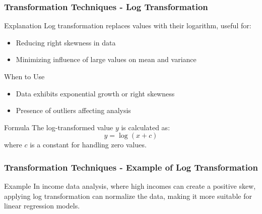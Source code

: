 \documentclass[aspectratio=169]{beamer}
\begin{document}
\begin{frame}[fragile]
    \frametitle{Transformation Techniques - Log Transformation}
    \begin{block}{Explanation}
        Log transformation replaces values with their logarithm, useful for:
        \begin{itemize}
            \item Reducing right skewness in data
            \item Minimizing influence of large values on mean and variance
        \end{itemize}
    \end{block}

    \begin{block}{When to Use}
        \begin{itemize}
            \item Data exhibits exponential growth or right skewness
            \item Presence of outliers affecting analysis
        \end{itemize}
    \end{block}

    \begin{block}{Formula}
        The log-transformed value \( y \) is calculated as:  
        \[
        y = \log(x + c) 
        \]
        where \( c \) is a constant for handling zero values.
    \end{block}
\end{frame}

\begin{frame}[fragile]
    \frametitle{Transformation Techniques - Example of Log Transformation}
    \begin{block}{Example}
        In income data analysis, where high incomes can create a positive skew, applying log transformation can normalize the data, making it more suitable for linear regression models.
    \end{block}
\end{frame}
\end{document}
